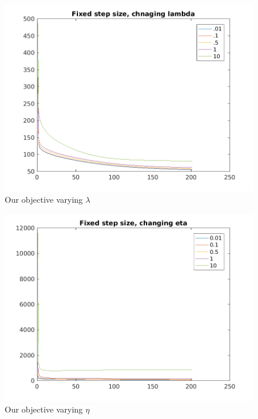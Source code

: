 \documentclass{article}
\newcommand{\0}{\mathrm{0}}
\newcommand{\1}{\mathrm{1}}
\begin{document}
\begin{figure}
  \includegraphics{fixed-step-lambda.png}
  \caption{Our objective varying $\lambda$}
\end{figure}

\begin{figure}
  \includegraphics{fixed-step-eta.png}
  \caption{Our objective varying $\eta$}
\end{figure}
\end{document}
